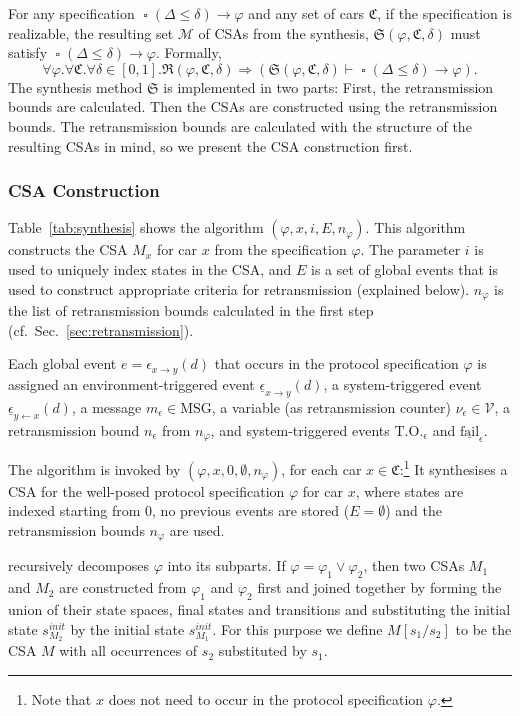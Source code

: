 \documentclass{sig-alternate}
\DeclareMathOperator{\always}{\mathop\square}
\renewcommand{\v}{\varphi}
\newcommand{\e}{\epsilon}
\renewcommand{\d}{\delta}
\newcommand{\dropprob}{\Delta}
\newcommand{\M}{\mathcal{M}}
\newcommand{\SAP}{\mathfrak{C}}
\newcommand{\Synth}{\mathfrak{S}}
\newcommand{\Realiz}{\mathfrak{R}}
\newcommand{\V}{\mathcal{V}}
\newcommand{\MSG}{\mathrm{MSG}}
\newcommand{\timeout}{\mathrm{T.O.}}
\newcommand{\locev}[1]{\underline{#1}}
\newcommand{\fail}{\locev{\mathrm{fail}}}
\newcommand{\glob}[4]{{#1}_{{#2} \rightarrow {#3}}(#4)}
\newcommand{\env}[4]{\locev{#1}_{{#2} \rightarrow {#3}}(#4)}
\newcommand{\sys}[4]{\locev{#1}_{{#2} \leftarrow {#3}}(#4)}
\renewcommand{\sec}[1]{Sec.\ \ref{sec:#1}}
\newcommand{\tab}[1]{Table~\ref{tab:#1}}
\begin{document}
For any specification $\always(\dropprob \leq \d) \rightarrow \v$ and any set of cars $\SAP$, if the specification is realizable, the resulting set $\M$ of CSAs from the synthesis, $\Synth(\v, \SAP, \d)$ must satisfy $\always(\dropprob \leq \d) \rightarrow \varphi$. Formally,
\begin{equation*}
	\forall \v . \forall \SAP . \forall \d \in [0, 1] . \Realiz(\v, \SAP, \d) \Rightarrow (\Synth(\v, \SAP, \d) \vdash \always(\dropprob \leq \d) \rightarrow \v).
\end{equation*}
The synthesis method $\Synth$ is implemented in two parts: First, the retransmission bounds are calculated. Then the CSAs are constructed using the retransmission bounds. The retransmission bounds are calculated with the structure of the resulting CSAs in mind, so we present the CSA construction first.


\subsubsection{CSA Construction}

\tab{synthesis} shows the algorithm {}$(\v, x, i, E, n_{\v})$. This algorithm constructs the CSA $M_x$ for car $x$ from the specification $\v$. The parameter $i$ is used to uniquely index states in the CSA, and $E$ is a set of global events that is used to construct appropriate criteria for retransmission (explained below). $n_{\v}$ is the list of retransmission bounds calculated in the first step (cf.\ \sec{retransmission}).

Each global event $e = \glob{\e}{x}{y}{d}$ that occurs in the protocol specification $\v$ is assigned an environment-triggered event $\env{\e}{x}{y}{d}$, a system-triggered event $\sys{\e}{y}{x}{d}$, a message $m_{\e} \in \MSG$, a variable (as retransmission counter) $\nu_{\e} \in \V$, a retransmission bound $n_{\e}$ from $n_{\v}$, and system-triggered events $\timeout_{\e}$ and $\fail_{\e}$.

The algorithm is invoked by {}$(\v, x, 0, \emptyset, n_{\v})$, for each car $x \in \SAP$:\footnote{Note that $x$ does not need to occur in the protocol specification $\v$.} It synthesises a CSA for the well-posed protocol specification $\v$ for car $x$, where states are indexed starting from $0$, no previous events are stored ($E = \emptyset$) and the retransmission bounds $n_{\v}$ are used.

{} recursively decomposes $\v$ into its subparts. If $\v = \v_1 \vee \v_2$, then two CSAs $M_1$ and $M_2$ are constructed from $\v_1$ and $\v_2$ first and joined together by forming the union of their state spaces, final states and transitions and substituting the initial state $s^{init}_{M_2}$ by the initial state $s^{init}_{M_1}$. For this purpose we define $M[s_1/s_2]$ to be the CSA $M$ with all occurrences of $s_2$ substituted by $s_1$.
\end{document}
